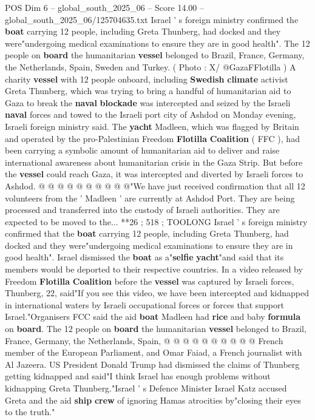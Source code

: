 \begin{textsample}{POS Dim 6 – global\_south\_2025\_06 – Score 14.00 – global\_south\_2025\_06/125704635.txt}  \label{ex:f6_pos_015}
Israel ' s foreign ministry confirmed the \textbf{boat} carrying 12 people, including Greta Thunberg, had docked and they were"undergoing medical examinations to ensure they are in good health".
The 12 people on \textbf{board} the humanitarian \textbf{vessel} belonged to Brazil, France, Germany, the Netherlands, Spain, Sweden and Turkey. ( Photo : X/ @GazaFFlotilla ) A charity \textbf{vessel} with 12 people onboard, including \textbf{Swedish} \textbf{climate} activist Greta Thunberg, which was trying to bring a handful of humanitarian aid to Gaza to break the \textbf{naval} \textbf{blockade} was intercepted and seized by the Israeli \textbf{naval} forces and towed to the Israeli port city of Ashdod on Monday evening, Israeli foreign ministry said.
The \textbf{yacht} Madleen, which was flagged by Britain and operated by the pro-Palestinian Freedom \textbf{Flotilla} \textbf{Coalition} ( FFC ), had been carrying a symbolic amount of humanitarian aid to deliver and raise international awareness about humanitarian crisis in the Gaza Strip.
But before the \textbf{vessel} could reach Gaza, it was intercepted and diverted by Israeli forces to Ashdod. @ @ @ @ @ @ @ @ @ @"We have just received confirmation that all 12 volunteers from the ' Madleen ' are currently at Ashdod Port.
They are being processed and transferred into the custody of Israeli authorities.
They are expected to be moved to the... **26 ; 518 ; TOOLONG Israel ' s foreign ministry confirmed that the \textbf{boat} carrying 12 people, including Greta Thunberg, had docked and they were"undergoing medical examinations to ensure they are in good health".
Israel dismissed the \textbf{boat} as a"\textbf{selfie} \textbf{yacht}"and said that its members would be deported to their respective countries.
In a video released by Freedom \textbf{Flotilla} \textbf{Coalition} before the \textbf{vessel} was captured by Israeli forces, Thunberg, 22, said"If you see this video, we have been intercepted and kidnapped in international waters by Israeli occupational forces or forces that support Israel."Organisers FCC said the aid \textbf{boat} Madleen had \textbf{rice} and baby \textbf{formula} on \textbf{board}.
The 12 people on \textbf{board} the humanitarian \textbf{vessel} belonged to Brazil, France, Germany, the Netherlands, Spain, @ @ @ @ @ @ @ @ @ @ French member of the European Parliament, and Omar Faiad, a French journalist with Al Jazeera.
US President Donald Trump had dismissed the claims of Thunberg getting kidnapped and said"I think Israel has enough problems without kidnapping Greta Thunberg."Israel ' s Defence Minister Israel Katz accused Greta and the aid \textbf{ship} \textbf{crew} of ignoring Hamas atrocities by"closing their eyes to the truth."

\end{textsample}
